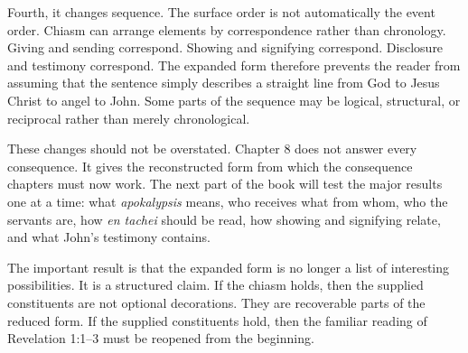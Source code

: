 Fourth, it changes sequence. The surface order is not automatically the event order. Chiasm can arrange elements by correspondence rather than chronology. Giving and sending correspond. Showing and signifying correspond. Disclosure and testimony correspond. The expanded form therefore prevents the reader from assuming that the sentence simply describes a straight line from God to Jesus Christ to angel to John. Some parts of the sequence may be logical, structural, or reciprocal rather than merely chronological.

These changes should not be overstated. Chapter 8 does not answer every consequence. It gives the reconstructed form from which the consequence chapters must now work. The next part of the book will test the major results one at a time: what \textit{apokalypsis} means, who receives what from whom, who the servants are, how \textit{en tachei} should be read, how showing and signifying relate, and what John's testimony contains.

The important result is that the expanded form is no longer a list of interesting possibilities. It is a structured claim. If the chiasm holds, then the supplied constituents are not optional decorations. They are recoverable parts of the reduced form. If the supplied constituents hold, then the familiar reading of Revelation 1:1--3 must be reopened from the beginning.
